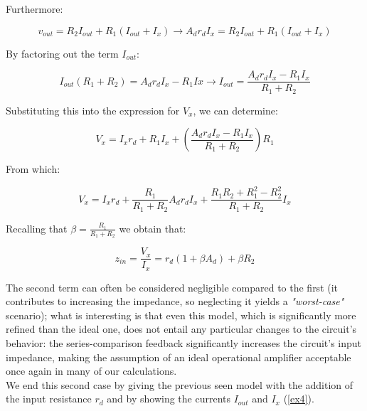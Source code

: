 \documentclass[../main.tex]{subfiles}
\begin{document}
Furthermore:

\begin{equation}
	v_{out} = R_2 I_{out} + R_1(I_{out} + I_x) \rightarrow A_dr_dI_x = R_2I_{out} + R_1(I_{out} + I_x)
\end{equation}

By factoring out the term $I_{out}$:

\begin{equation}
	I_{out}(R_1 + R_2) = A_dr_dI_x - R_1Ix \rightarrow I_{out} = \frac{A_dr_dI_x - R_1I_x}{R_1 + R_2}	
\end{equation}

Substituting this into the expression for $V_x$, we can determine:

\begin{equation}
	V_x = I_xr_d + R_1I_x + \left( \frac{A_dr_dI_x - R_1I_x}{R_1 + R_2} \right) R_1
\end{equation}

From which:


\begin{equation}
	V_x = I_xr_d + \frac{R_1}{R_1 + R_2} A_dr_dI_x + \frac{R_1R_2 + R_1^2 - R_2^2}{R_1 + R_2} I_x
\end{equation}

Recalling that $\beta = \frac{R_1}{R_1 + R_2}$ we obtain that:

\begin{equation}
	z_{in} = \frac{V_x}{I_x} = r_d (1+ \beta A_d) + \beta R_2
\end{equation}

The second term can often be considered negligible compared to the first
(it contributes to increasing the impedance, so neglecting it yields a
\textit{"worst-case"} scenario); what is interesting is that even this model, which is significantly more refined than the ideal one, does not entail any particular changes to the circuit’s behavior: the series-comparison feedback significantly increases the circuit’s input impedance, making the assumption of an ideal operational amplifier acceptable once again in many of our calculations.\\

We end this second case by giving the previous seen model with the addition of the input resistance $r_d$ and by showing the currents $I_{out}$ and $I_x$ (\autoref{ex4}).
\end{document}
